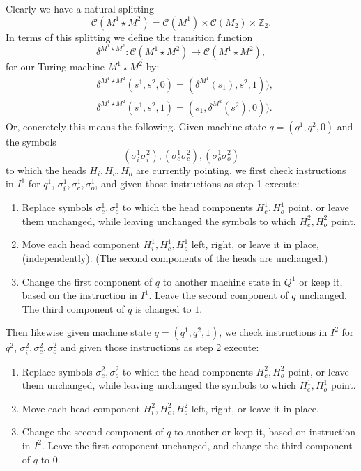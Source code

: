 \documentclass{amsart}  %
\numberwithin{equation}{section}
\theoremstyle{definition}
\theoremstyle{remark}
\begin{document}
{Clearly we have a natural splitting $$\mathcal{C} (M ^{1} \star M ^{2}  ) = \mathcal{C} (M ^{1} ) \times \mathcal{C} (M _{2} ) \times \mathbb{Z} _{2}.
$$ In terms of this splitting we define the transition function 
\begin{equation*}
\delta ^{M ^{1} \star M ^{2}  }: \mathcal{C} (M ^{1} \star M ^{2}  ) \to \mathcal{C} (M ^{1} \star M ^{2}  ),
\end{equation*}
for our Turing machine $M ^{1} \star M ^{2}  $ by:
\begin{align*}
   & \delta ^{M ^{1} \star M ^{2}  } (s ^{1}, s ^{2}, 0  ) = (\delta ^{M ^{1} } (s _{1}), s ^{2},1  ) ), \\
   & \delta ^{M ^{1} \star M ^{2}  } (s ^{1}, s ^{2}, 1  ) = ( s _{1}, \delta ^{M ^{2} } (s ^{2}),0 )).
\end{align*}
Or, concretely this means the following. Given machine state $q=(q ^{1}, q ^{2}, 0)$ and the symbols $$(\sigma _{i} ^{1} \sigma _{i} ^{2}), (\sigma _{c} ^{1} \sigma _{c} ^{2}), (\sigma _{o} ^{1} \sigma _{o} ^{2})      $$ to which the heads $H _{i}, H _{c}, H _{o}   $ are currently pointing, we first check instructions in $I ^{1} $ for $q ^{1} $, $ \sigma _{i} ^{1} ,  \sigma _{c} ^{1}, \sigma _{o} ^{1}    $, and given those instructions as step 1 execute:
\begin{enumerate}
 \item Replace symbols $\sigma ^{1}  _{c}, \sigma ^{1}  _{o}  $ to which the head components $H ^{1}  _{c}, H ^{1}  _{o}  $ point, or leave them  unchanged, while leaving unchanged the symbols to which $H ^{2}  _{c}, H ^{2}  _{o}  $ point.
\item Move each head component $H ^{1}  _{i}, H ^{1}  _{c}, H ^{1}  _{o}   $ left, right, or leave it in place, (independently). (The second components of the heads are unchanged.)
   \item Change the first component of $q$ to another machine state in $Q ^{1} $ or keep it, based on the instruction in $I ^{1} $. Leave the second component of $q$ unchanged. The third component of $q$ is changed to $1$.  
\end{enumerate} 
Then likewise given machine state $q=(q ^{1}, q ^{2}, 1)$,  we check instructions in $I ^{2} $ for $q ^{2} $, $ \sigma _{i} ^{2} ,  \sigma _{c} ^{2}, \sigma _{o} ^{2}$ and given those instructions as step 2 execute:
\begin{enumerate}
 \item 
Replace symbols $\sigma ^{2}  _{c}, \sigma ^{2}  _{o}  $ to which the head components $H ^{2}  _{c}, H ^{2}  _{o}  $ point, or leave them  unchanged, while leaving unchanged the symbols to which $H ^{1}  _{c}, H ^{1}  _{o}  $ point.
\item Move each head component $H ^{2}  _{i}, H ^{2}  _{c}, H ^{2}  _{o}   $ left, right, or leave it in place.
\item Change the second component of $q$ to another or keep it, based on instruction in $I ^{2} $. Leave the first component unchanged, and change the third component of $q$ to $0$.  
\end{enumerate} 
}
\end{document}
